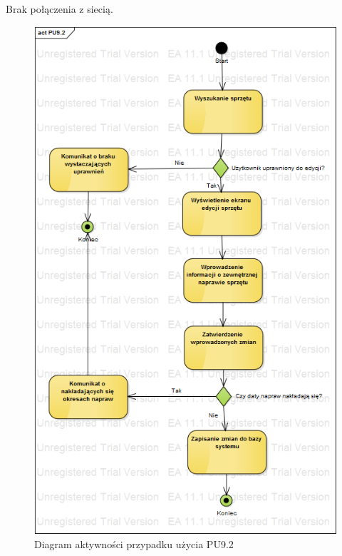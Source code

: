 Brak połączenia z siecią.

\begin{figure}[h!]
	\centering
	\includegraphics[scale=0.6]{img/diagrams/activityDiagrams/PU92}
	\caption{Diagram aktywności przypadku użycia PU9.2 \label{fig:labelADPU9.2}}
\end{figure}

